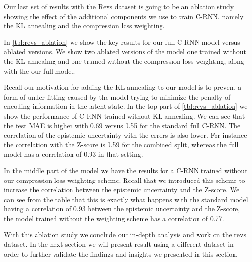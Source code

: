 Our last set of results with the Revs dataset is going to be an ablation study, showing the effect of the additional components we use to train C-RNN, namely the KL annealing and the compression loss weighting. 

In \cref{tbl:revs_ablation} we show the key results for our full C-RNN model versus ablated versions. We show two ablated versions of the model one trained without the KL annealing and one trained without the compression loss weighting, along with the our full model.

Recall our motivation for adding the KL annealing to our model is to prevent a form of under-fitting caused by the model trying to minimize the penalty of encoding information in the latent state. In the top part of \cref{tbl:revs_ablation} we show the performance of C-RNN trained without KL annealing. We can see that the test MAE is higher with 0.69 versus 0.55 for the standard full C-RNN. The correlation of the epistemic uncertainty with the errors is also lower. For instance the correlation with the Z-score is 0.59 for the combined split, whereas the full model has a correlation of 0.93 in that setting. 

In the middle part of the model we have the results for a C-RNN trained without our compression loss weighting scheme. Recall that we introduced this scheme to increase the correlation between the epistemic uncertainty and the Z-score. We can see from the table that this is exactly what happens with the standard model having a correlation of 0.93 between the epistemic uncertainty and the Z-score, the model trained without the weighting scheme has a correlation of 0.77. 




With this ablation study we conclude our in-depth analysis and work on the revs dataset. In the next section we will present result using a different dataset in order to further validate the findings and insights we presented in this section. 